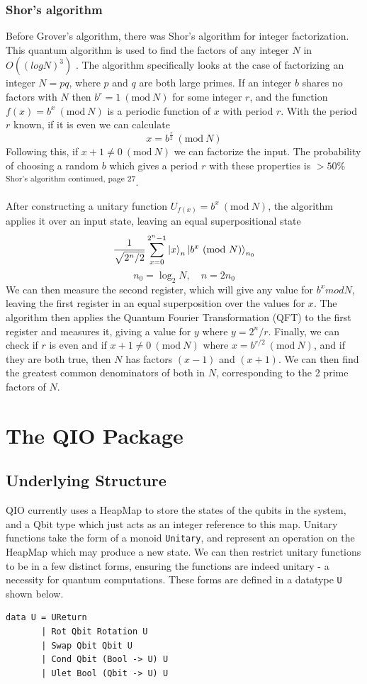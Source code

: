 \documentclass[a4paper,10pt, titlepage, twoside]{article}
\newcommand{\Mod}[1]{\ (\mathrm{mod}\ #1)}
\begin{document}
\subsubsection{Shor's algorithm}
Before Grover's algorithm, there was Shor's algorithm for integer factorization. This quantum algorithm is used to find the factors of any integer $N$ in ~$O((log N)^3)$ \cite{shorcomplexity}. The algorithm specifically looks at the case of factorizing an integer $N = pq$, where $p$ and $q$ are both large primes. If an integer $b$ shares no factors with $N$ then $b^r = 1 \Mod N$ for some integer $r$, and the function $f(x) = b^x \Mod N$ is a periodic function of $x$ with period $r$. With the period $r$ known, if it is even we can calculate
$$x = b^{\frac{r}{2}} \Mod N$$
Following this, if $x + 1 \neq 0 \Mod N$ we can factorize the input. The probability of choosing a random $b$ which gives a period $r$ with these properties is $>50\%$ \cite{nsc}\textsuperscript{Shor's algorithm continued, page 27}.\par
After constructing a unitary function $U_{f(x)} = b^x \Mod N$, the algorithm applies it over an input state, leaving an equal superpositional state 
$$\frac{1}{\sqrt{2^n/2}}\sum_{x=0}^{2^n-1} \ket{x}_n \ket{b^x \Mod N}_{n_0}$$
$$n_0 =\log_2 N,\quad n = 2n_0$$
We can then measure the second register, which will give any value for $b^x mod N$, leaving the first register in an equal superposition over the values for $x$. The algorithm then applies the Quantum Fourier Transformation (QFT) to the first register and measures it, giving a value for $y$ where $y = 2^n/r$. Finally, we can check if $r$ is even and if $x + 1 \neq 0 \Mod N$ where $x = b^{r/2} \Mod N$, and if they are both true, then $N$ has factors $(x-1)$ and $(x+1)$. We can then find the greatest common denominators of both in $N$, corresponding to the 2 prime factors of $N$.

\section{The QIO Package}
\subsection{Underlying Structure}
QIO currently uses a HeapMap to store the states of the qubits in the system, and a Qbit type which just acts as an integer reference to this map. Unitary functions take the form of a monoid \texttt{Unitary}, and represent an operation on the HeapMap which may produce a new state. We can then restrict unitary functions to be in a few distinct forms, ensuring the functions are indeed unitary - a necessity for quantum computations. These forms are defined in a datatype \texttt{U} shown below.
\begin{verbatim}
data U = UReturn 
       | Rot Qbit Rotation U 
       | Swap Qbit Qbit U 
       | Cond Qbit (Bool -> U) U 
       | Ulet Bool (Qbit -> U) U
\end{verbatim}
\end{document}
